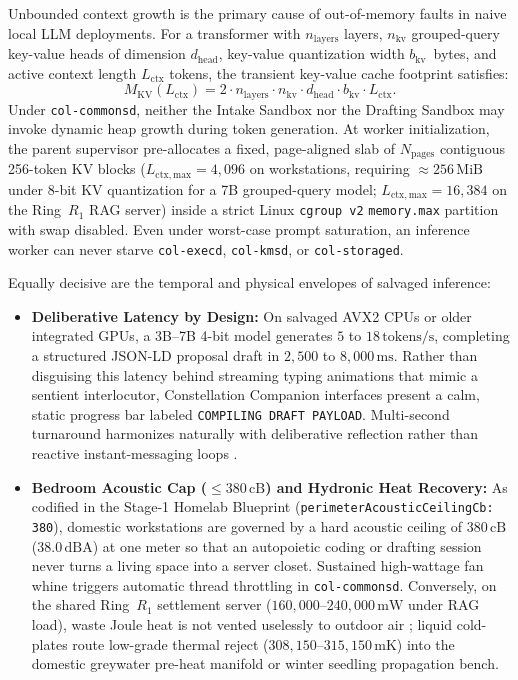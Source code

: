 Unbounded context growth is the primary cause of out-of-memory faults in naive local LLM deployments. For a transformer with $n_{\mathrm{layers}}$ layers, $n_{\mathrm{kv}}$ grouped-query key-value heads of dimension $d_{\mathrm{head}}$, key-value quantization width $b_{\mathrm{kv}}$~bytes, and active context length $L_{\mathrm{ctx}}$ tokens, the transient key-value cache footprint satisfies:
\begin{equation}
M_{\mathrm{KV}}(L_{\mathrm{ctx}}) = 2 \cdot n_{\mathrm{layers}} \cdot n_{\mathrm{kv}} \cdot d_{\mathrm{head}} \cdot b_{\mathrm{kv}} \cdot L_{\mathrm{ctx}}.
\label{eq:kv-cache-arena}
\end{equation}
Under \texttt{col-commonsd}, neither the Intake Sandbox nor the Drafting Sandbox may invoke dynamic heap growth during token generation. At worker initialization, the parent supervisor pre-allocates a fixed, page-aligned slab of $N_{\mathrm{pages}}$ contiguous 256-token KV blocks ($L_{\mathrm{ctx,max}} = 4{,}096$ on workstations, requiring $\approx 256\,\mathrm{MiB}$ under 8-bit KV quantization for a 7B grouped-query model; $L_{\mathrm{ctx,max}} = 16{,}384$ on the Ring~$R_1$ RAG server) inside a strict Linux \texttt{cgroup v2} \texttt{memory.max} partition with swap disabled. Even under worst-case prompt saturation, an inference worker can never starve \texttt{col-execd}, \texttt{col-kmsd}, or \texttt{col-storaged}.

Equally decisive are the temporal and physical envelopes of salvaged inference:
\begin{itemize}
  \item \textbf{Deliberative Latency by Design:} On salvaged AVX2 CPUs or older integrated GPUs, a 3B--7B 4-bit model generates $5$ to $18\,\mathrm{tokens/s}$, completing a structured JSON-LD proposal draft in $2{,}500$ to $8{,}000\,\mathrm{ms}$. Rather than disguising this latency behind streaming typing animations that mimic a sentient interlocutor, Constellation Companion interfaces present a calm, static progress bar labeled \texttt{COMPILING DRAFT PAYLOAD}. Multi-second turnaround harmonizes naturally with deliberative reflection rather than reactive instant-messaging loops \parencite{weiser1996calm,han2015}.
  \item \textbf{Bedroom Acoustic Cap ($\le 380\,\mathrm{cB}$) and Hydronic Heat Recovery:} As codified in the Stage-1 Homelab Blueprint (\texttt{perimeterAcousticCeilingCb: 380}), domestic workstations are governed by a hard acoustic ceiling of $380\,\mathrm{cB}$ ($38.0\,\mathrm{dBA}$) at one meter so that an autopoietic coding or drafting session never turns a living space into a server closet. Sustained high-wattage fan whine triggers automatic thread throttling in \texttt{col-commonsd}. Conversely, on the shared Ring~$R_1$ settlement server ($160{,}000$--$240{,}000\,\mathrm{mW}$ under RAG load), waste Joule heat is not vented uselessly to outdoor air \parencite{georgescu1971}; liquid cold-plates route low-grade thermal reject ($308{,}150$--$315{,}150\,\mathrm{mK}$) into the domestic greywater pre-heat manifold or winter seedling propagation bench.
\end{itemize}

